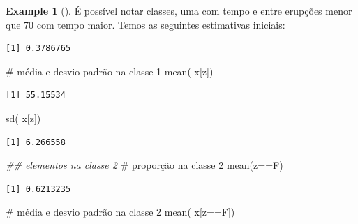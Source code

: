 \documentclass[
  letterpaper,
  DIV=11,
  numbers=noendperiod]{scrreprt}
\newenvironment{Shaded}{\begin{snugshade}}{\end{snugshade}}
\newcommand{\CommentTok}[1]{\textcolor[rgb]{0.37,0.37,0.37}{#1}}
\newcommand{\DecValTok}[1]{\textcolor[rgb]{0.68,0.00,0.00}{#1}}
\newcommand{\DocumentationTok}[1]{\textcolor[rgb]{0.37,0.37,0.37}{\textit{#1}}}
\newcommand{\FunctionTok}[1]{\textcolor[rgb]{0.28,0.35,0.67}{#1}}
\newcommand{\NormalTok}[1]{\textcolor[rgb]{0.00,0.23,0.31}{#1}}
\newcommand{\OtherTok}[1]{\textcolor[rgb]{0.00,0.23,0.31}{#1}}
\newcommand{\SpecialCharTok}[1]{\textcolor[rgb]{0.37,0.37,0.37}{#1}}
\theoremstyle{definition}
\theoremstyle{plain}
\theoremstyle{definition}
\newtheorem{example}{Example}[chapter]
\theoremstyle{remark}
\begin{document}
\begin{example}[]
É possível notar classes, uma com tempo e entre erupções menor que 70
com tempo maior. Temos as seguintes estimativas iniciais:

\begin{Shaded}
\end{Shaded}

\begin{verbatim}
[1] 0.3786765
\end{verbatim}

\begin{Shaded}
\begin{Highlighting}[]
\CommentTok{\# média e desvio padrão na classe 1}
\FunctionTok{mean}\NormalTok{( x[z])}
\end{Highlighting}
\end{Shaded}

\begin{verbatim}
[1] 55.15534
\end{verbatim}

\begin{Shaded}
\begin{Highlighting}[]
\FunctionTok{sd}\NormalTok{( x[z])}
\end{Highlighting}
\end{Shaded}

\begin{verbatim}
[1] 6.266558
\end{verbatim}

\begin{Shaded}
\begin{Highlighting}[]
\DocumentationTok{\#\# elementos na classe 2}
\CommentTok{\# proporção na classe 2}
\FunctionTok{mean}\NormalTok{(z}\SpecialCharTok{==}\NormalTok{F)}
\end{Highlighting}
\end{Shaded}

\begin{verbatim}
[1] 0.6213235
\end{verbatim}

\begin{Shaded}
\begin{Highlighting}[]
\CommentTok{\# média e desvio padrão na classe 2}
\FunctionTok{mean}\NormalTok{( x[z}\SpecialCharTok{==}\NormalTok{F])}
\end{Highlighting}
\end{Shaded}


\end{example}
\end{document}
